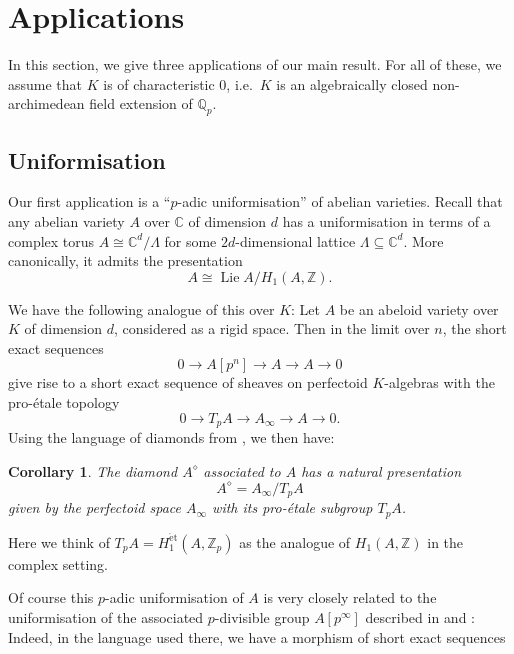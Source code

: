 \documentclass[10pt,oneside]{amsart}
\newtheorem{corollary}[theorem]{Corollary}
\theoremstyle{definition}
\newcommand{\et}{\operatorname{\acute{e}t}}
\newcommand{\Z}{\mathbb{Z}}
\newcommand{\Q}{\mathbb{Q}}
\begin{document}
	
 
	\section{Applications}
	In this section, we give three applications of our main result. For all of these, we assume that $K$ is of characteristic $0$, i.e.\ $K$ is an algebraically closed non-archimedean field extension of $\Q_p$.
	\subsection{Uniformisation}
	Our first application is a ``$p$-adic uniformisation'' of abelian varieties.
	Recall that any abelian variety $A$ over $\mathbb C$ of dimension $d$ has a uniformisation in terms of a complex torus $A\cong \mathbb C^d/\Lambda$ for some $2d$-dimensional lattice $\Lambda\subseteq \mathbb C^d$. More canonically, it admits the presentation
\[
 A\cong \operatorname{Lie} A/H_1(A,\Z).
\]
	
	We have the following analogue of this over $K$: Let $A$ be an abeloid variety over $K$ of dimension $d$, considered as a rigid space. Then in the limit over $n$, the short exact sequences
	\[ 0\to A[p^n]\to A\to A\to 0\]
	give rise to a short exact sequence of sheaves on perfectoid $K$-algebras with the pro-\'etale topology
	\[0\to T_pA \to A_\infty \to A\to 0.\]
	Using the language of diamonds from \cite{etale_cohomology_of_diamonds}, we then have:
	\begin{corollary}
		The diamond $A^{\diamond}$ associated to $A$ has a natural presentation
		\[A^{\diamond} = A_\infty/T_pA \]
		given by the perfectoid space $A_\infty$ with its pro-\'etale subgroup $T_pA$.
	\end{corollary}
	Here we think of $T_pA=H^{\et}_1(A,\Z_p)$ as the analogue of $H_1(A,\Z)$ in the complex setting.

	Of course this $p$-adic uniformisation of $A$ is very closely related to the uniformisation of the associated $p$-divisible group $A[p^\infty]$ described in \cite{SW} and \cite[\S4]{survey}: Indeed, in the language used there, we have a morphism of short exact sequences
	
\end{document}
